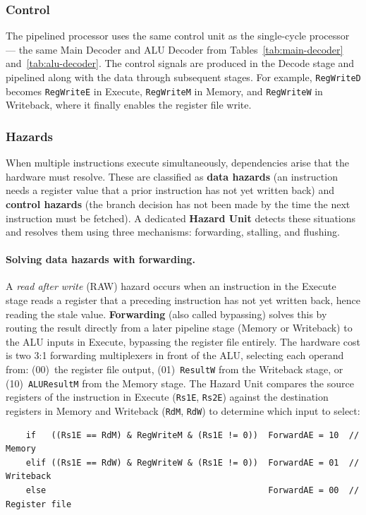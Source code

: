 \documentclass[9pt, a4paper]{extarticle}
\begin{document}
\subsubsection{Control} The pipelined processor uses the same control unit as the single-cycle processor --- the same Main Decoder and ALU Decoder from Tables~\ref{tab:main-decoder} and~\ref{tab:alu-decoder}. The control signals are produced in the Decode stage and pipelined along with the data through subsequent stages. For example, \texttt{RegWriteD} becomes \texttt{RegWriteE} in Execute, \texttt{RegWriteM} in Memory, and \texttt{RegWriteW} in Writeback, where it finally enables the register file write.

\subsubsection{Hazards}

When multiple instructions execute simultaneously, dependencies arise that the hardware must resolve. These are classified as \textbf{data hazards} (an instruction needs a register value that a prior instruction has not yet written back) and \textbf{control hazards} (the branch decision has not been made by the time the next instruction must be fetched). A dedicated \textbf{Hazard Unit} detects these situations and resolves them using three mechanisms: forwarding, stalling, and flushing.

\paragraph{Solving data hazards with forwarding.} A \textit{read after write} (RAW) hazard occurs when an instruction in the Execute stage reads a register that a preceding instruction has not yet written back, hence reading the stale value. \textbf{Forwarding} (also called bypassing) solves this by routing the result directly from a later pipeline stage (Memory or Writeback) to the ALU inputs in Execute, bypassing the register file entirely. The hardware cost is two 3:1 forwarding multiplexers in front of the ALU, selecting each operand from: (00)~the register file output, (01)~\texttt{ResultW} from the Writeback stage, or (10)~\texttt{ALUResultM} from the Memory stage. The Hazard Unit compares the source registers of the instruction in Execute (\texttt{Rs1E}, \texttt{Rs2E}) against the destination registers in Memory and Writeback (\texttt{RdM}, \texttt{RdW}) to determine which input to select:

\begin{verbatim}
    if   ((Rs1E == RdM) & RegWriteM & (Rs1E != 0))  ForwardAE = 10  // Memory
    elif ((Rs1E == RdW) & RegWriteW & (Rs1E != 0))  ForwardAE = 01  // Writeback
    else                                            ForwardAE = 00  // Register file
\end{verbatim}
\end{document}
